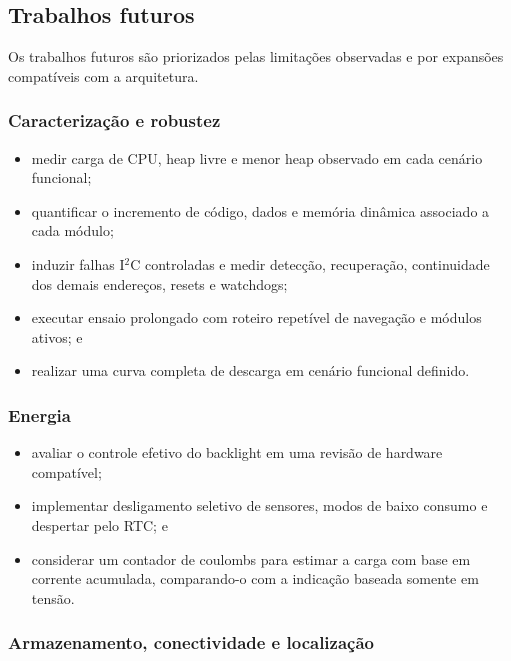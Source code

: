 \documentclass[a4paper,12pt]{article}
\begin{document}
\subsection{Trabalhos futuros}


Os trabalhos futuros s\~ao priorizados pelas limita\c{c}\~oes observadas e por expans\~oes compat\'iveis com a arquitetura.


\subsubsection{Caracteriza\c{c}\~ao e robustez}


\begin{itemize}
    \item medir carga de CPU, heap livre e menor heap observado em cada cen\'ario funcional;
    \item quantificar o incremento de c\'odigo, dados e mem\'oria din\^amica associado a cada m\'odulo;
    \item induzir falhas I$^2$C controladas e medir detec\c{c}\~ao, recupera\c{c}\~ao, continuidade dos demais endere\c{c}os, resets e watchdogs;
    \item executar ensaio prolongado com roteiro repet\'ivel de navega\c{c}\~ao e m\'odulos ativos; e
    \item realizar uma curva completa de descarga em cen\'ario funcional definido.
\end{itemize}


\subsubsection{Energia}


\begin{itemize}
    \item avaliar o controle efetivo do backlight em uma revis\~ao de hardware compat\'ivel;
    \item implementar desligamento seletivo de sensores, modos de baixo consumo e despertar pelo RTC; e
    \item considerar um contador de coulombs para estimar a carga com base em corrente acumulada, comparando-o com a indica\c{c}\~ao baseada somente em tens\~ao.
\end{itemize}


\subsubsection{Armazenamento, conectividade e localiza\c{c}\~ao}
\end{document}
